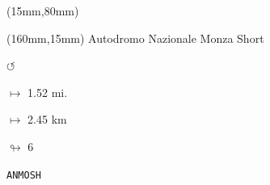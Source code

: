 \begin{textblock*}{185mm}(15mm,80mm)%
\end{textblock*}
\begin{textblock*}{40mm}(160mm,15mm)%
Autodromo Nazionale Monza Short
\par \Huge$\circlearrowleft$
\Large
\par$\mapsto$ 1.52 mi.
\par$\mapsto$ 2.45 km
\par$\looparrowright$ 6
\par\hfill\tiny\tt ANMOSH\\
\end{textblock*}
\null\newpage

